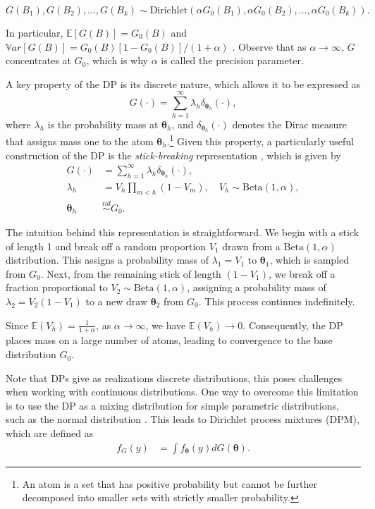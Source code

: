\[
G(B_1), G(B_2), \dots, G(B_k) \sim \text{Dirichlet}(\alpha G_0(B_1), \alpha G_0(B_2), \dots, \alpha G_0(B_k)).
\]

In particular, $\mathbb{E}\left[G(B)\right]=G_0(B)$ and $\mathbb{V}ar\left[G(B)\right]=G_0(B)\left[1-G_0(B)\right]/(1+\alpha)$ \cite[p.~8]{Muller2015}. Observe that as $\alpha  \rightarrow \infty$, $G$ concentrates at $G_0$, which is why $\alpha$ is called the precision parameter.

A key property of the DP is its discrete nature, which allows it to be expressed as  
\[
G(\cdot)=\sum_{h=1}^{\infty}\lambda_h\delta_{\boldsymbol{\theta}_h}(\cdot),
\]
where $\lambda_h$ is the probability mass at $\boldsymbol{\theta}_h$, and $\delta_{\boldsymbol{\theta}_h}(\cdot)$ denotes the Dirac measure that assigns mass one to the atom $\boldsymbol{\theta}_h$.\footnote{An atom is a set that has positive probability but cannot be further decomposed into smaller sets with strictly smaller probability.} Given this property, a particularly useful construction of the DP is the \textit{stick-breaking} representation \cite{Sethuraman1994}, which is given by  
\begin{align*}
	G(\cdot)&=\sum_{h=1}^{\infty}\lambda_h\delta_{\boldsymbol{\theta}_h}(\cdot),\\
	\lambda_h&=V_h\prod_{m<h}(1-V_m), \quad V_h\sim \text{Beta}(1,\alpha),\\
	\boldsymbol{\theta}_h&\stackrel{iid}{\sim} G_0.
\end{align*}  

The intuition behind this representation is straightforward. We begin with a stick of length 1 and break off a random proportion $V_1$ drawn from a $\text{Beta}(1,\alpha)$ distribution. This assigns a probability mass of $\lambda_1=V_1$ to $\boldsymbol{\theta}_1$, which is sampled from $G_0$. Next, from the remaining stick of length $(1-V_1)$, we break off a fraction proportional to $V_2 \sim \text{Beta}(1,\alpha)$, assigning a probability mass of $\lambda_2=V_2(1-V_1)$ to a new draw $\boldsymbol{\theta}_2$ from $G_0$. This process continues indefinitely. 

Since $\mathbb{E}(V_h) = \frac{1}{1+\alpha}$, as $\alpha \rightarrow \infty$, we have $\mathbb{E}(V_h) \rightarrow 0$. Consequently, the DP places mass on a large number of atoms, leading to convergence to the base distribution $G_0$.  

Note that DPs give as realizations discrete distributions, this poses challenges when working with continuous distributions. One way to overcome this limitation is to use the DP as a mixing distribution for simple parametric distributions, such as the normal distribution \cite{Escobar1995}. This leads to Dirichlet process mixtures (DPM), which are defined as  
\begin{align*}
	f_G(y) &= \int f_{\boldsymbol{\theta}}(y) dG(\boldsymbol{\theta}).
\end{align*}

